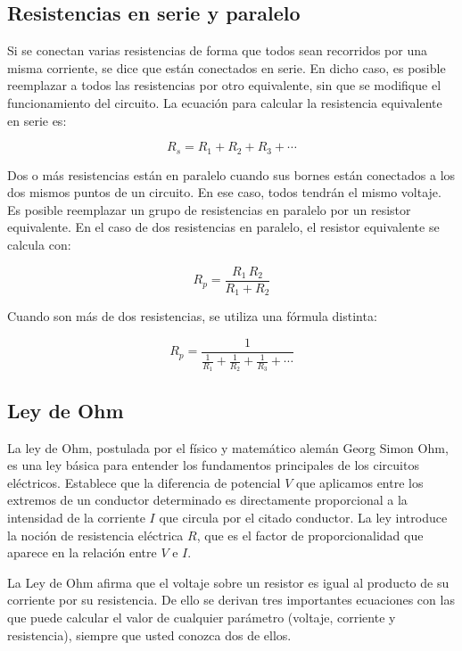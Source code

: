 \documentclass{article}
\begin{document}
    \subsection*{Resistencias en serie y paralelo}

    Si se conectan varias resistencias de forma que todos sean recorridos por una misma corriente, se dice que están conectados en serie. En dicho caso, es posible reemplazar a todos las resistencias por otro equivalente, sin que se modifique el funcionamiento del circuito. La ecuación para calcular la resistencia equivalente en serie es:

    \[
        R_s = R_1 + R_2 + R_3 + \cdots
    \]

    Dos o más resistencias están en paralelo cuando sus bornes están conectados a los dos mismos puntos de un circuito. En ese caso, todos tendrán el mismo voltaje. Es posible reemplazar un grupo de resistencias en paralelo por un resistor equivalente. En el caso de dos resistencias en paralelo, el resistor equivalente se calcula con:

    \[
        R_p = \frac{R_1\,R_2}{R_1 + R_2}
    \]

    Cuando son más de dos resistencias, se utiliza una fórmula distinta:

    \[
        R_p = \frac{1}{\frac{1}{R_1} + \frac{1}{R_2} + \frac{1}{R_3} + \cdots}
    \]


    \subsection*{Ley de Ohm}

    La ley de Ohm, postulada por el físico y matemático alemán Georg Simon Ohm, es una ley básica para entender los fundamentos principales de los circuitos eléctricos. Establece que la diferencia de potencial $V$ que aplicamos entre los extremos de un conductor determinado es directamente proporcional a la intensidad de la corriente $I$ que circula por el citado conductor. La ley introduce la noción de resistencia eléctrica $R$, que es el factor de proporcionalidad que aparece en la relación entre $V$ e $I$.

    La Ley de Ohm afirma que el voltaje sobre un resistor es igual al producto de su corriente por su resistencia. De ello se derivan tres importantes ecuaciones con las que puede calcular el valor de cualquier parámetro (voltaje, corriente y resistencia), siempre que usted conozca dos de ellos.
\end{document}
